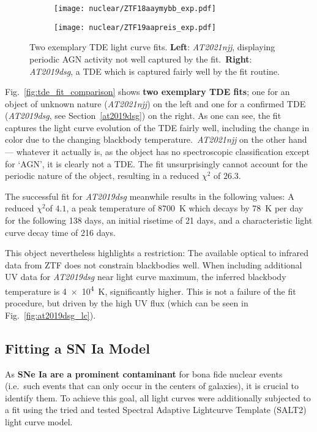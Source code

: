 \begin{figure}[htb]
  \centering
  \begin{subfigure}[b]{0.49\textwidth}
    \centering
    \texttt{[image: nuclear/ZTF18aaymybb\_exp.pdf]}
  \end{subfigure}
  \begin{subfigure}[b]{0.49\textwidth}
    \centering
    \texttt{[image: nuclear/ZTF19aapreis\_exp.pdf]}
  \end{subfigure}
  \caption[Two exemplary TDE fits]{Two exemplary TDE light curve fits. \textbf{Left}: \textit{AT2021njj}, displaying periodic AGN activity not well captured by the fit.\ \textbf{Right}: \textit{AT2019dsg}, a TDE which is captured fairly well by the fit routine.}
\end{figure}

Fig.~\ref{fig:tde_fit_comparison} shows \textbf{two exemplary TDE fits}; one for an object of unknown nature (\textit{AT2021njj}) on the left and one for a confirmed TDE (\textit{AT2019dsg}, see Section~\ref{at2019dsg}) on the right. As one can see, the fit captures the light curve evolution of the TDE fairly well, including the change in color due to the changing blackbody temperature.~\textit{AT2021njj} on the other hand --- whatever it actually is, as the object has no spectroscopic classification except for `AGN', it is clearly not a TDE. The fit unsurprisingly cannot account for the periodic nature of the object, resulting in a reduced $\chi^2$ of $26.3$.

The successful fit for \textit{AT2019dsg} meanwhile results in the following values: A reduced $\chi^2$of $4.1$, a peak temperature of \SI{8700}{\K} which decays by \SI{78}{\K} per day for the following 138 days, an initial risetime of 21 days, and a characteristic light curve decay time of 216 days.

This object nevertheless highlights a restriction: The available optical to infrared data from ZTF does not constrain blackbodies well. When including additional UV data for \textit{AT2019dsg} near light curve maximum, the inferred blackbody temperature is \SI{4e4}{\K}, significantly higher. This is not a failure of the fit procedure, but driven by the high UV flux (which can be seen in Fig.~\ref{fig:at2019dsg_lc}).

\subsection{Fitting a SN Ia Model}\label{salt}
As \textbf{SNe Ia are a prominent contaminant} for bona fide nuclear events (i.e.~such events that can only occur in the centers of galaxies), it is crucial to identify them. To achieve this goal, all light curves were additionally subjected to a fit using the tried and tested Spectral Adaptive Lightcurve Template (SALT2)~ light curve model. %

